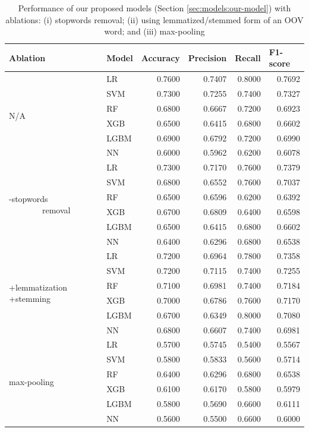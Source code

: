 \begin{table}[htbp]
\centering
\begin{tabular}{p{3cm}lrrrr}
\hline
\textbf{Ablation} & \textbf{Model} & \multicolumn{1}{l}{\textbf{Accuracy}} & \multicolumn{1}{l}{\textbf{Precision}} & \multicolumn{1}{l}{\textbf{Recall}} & \multicolumn{1}{l}{\textbf{F1-score}} \\ \hline
\multirow{6}{*}{N/A} & LR & 0.7600 & 0.7407 & 0.8000 & 0.7692 \\
 & SVM & 0.7300 & 0.7255 & 0.7400 & 0.7327 \\
 & RF & 0.6800 & 0.6667 & 0.7200 & 0.6923 \\
 & XGB & 0.6500 & 0.6415 & 0.6800 & 0.6602 \\
 & LGBM & 0.6900 & 0.6792 & 0.7200 & 0.6990 \\
 & NN & 0.6000 & 0.5962 & 0.6200 & 0.6078 \\ \hline
\multirow{6}{*}{\parbox{3cm}{-stopwords  \ \ \ \ \ \ \ \ removal}} & LR & 0.7300 & 0.7170 & 0.7600 & 0.7379 \\
 & SVM & 0.6800 & 0.6552 & 0.7600 & 0.7037 \\
 & RF & 0.6500 & 0.6596 & 0.6200 & 0.6392 \\
 & XGB & 0.6700 & 0.6809 & 0.6400 & 0.6598 \\
 & LGBM & 0.6500 & 0.6415 & 0.6800 & 0.6602 \\
 & NN & 0.6400 & 0.6296 & 0.6800 & 0.6538 \\ \hline
\multirow{6}{*}{\parbox{3cm}{+lemmatization +stemming}} & LR & 0.7200 & 0.6964 & 0.7800 & 0.7358 \\
 & SVM & 0.7200 & 0.7115 & 0.7400 & 0.7255 \\
 & RF & 0.7100 & 0.6981 & 0.7400 & 0.7184 \\
 & XGB & 0.7000 & 0.6786 & 0.7600 & 0.7170 \\
 & LGBM & 0.6700 & 0.6349 & 0.8000 & 0.7080 \\
 & NN & 0.6800 & 0.6607 & 0.7400 & 0.6981 \\ \hline
\multirow{6}{*}{\parbox{3cm}{max-pooling}} & LR & 0.5700 & 0.5745 & 0.5400 & 0.5567 \\
 & SVM & 0.5800 & 0.5833 & 0.5600 & 0.5714 \\
 & RF & 0.6400 & 0.6296 & 0.6800 & 0.6538 \\
 & XGB & 0.6100 & 0.6170 & 0.5800 & 0.5979 \\
 & LGBM & 0.5800 & 0.5690 & 0.6600 & 0.6111 \\
 & NN & 0.5600 & 0.5500 & 0.6600 & 0.6000 \\ \hline
\end{tabular}
\caption{Performance of our proposed models (Section \ref{sec:models:our-model}) with ablations: (i) stopwords removal; (ii) using lemmatized/stemmed form of an OOV word; and (iii) max-pooling}
\label{tab:results:performance-our-model:abl}
\end{table}

